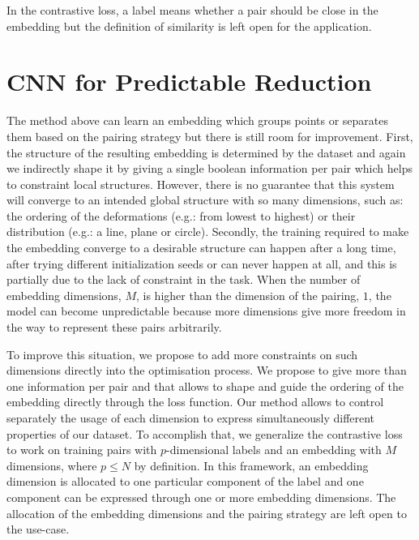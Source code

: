 \documentclass[a4paper,12pt]{report}
\newcommand{\eg}{e.g.}
\begin{document}
In the contrastive loss, a label means whether a pair should be close in the embedding but the definition of similarity is left open for the application.

\section{CNN for Predictable Reduction}
The method above can learn an embedding which groups points or separates them based on the pairing strategy but there is still room for improvement.
First, the structure of the resulting embedding is determined by the dataset and again we indirectly shape it by giving a single boolean information per pair which helps to constraint local structures.
However, there is no guarantee that this system will converge to an intended global structure with so many dimensions, such as: the ordering of the deformations (\eg: from lowest to highest) or their distribution (\eg: a line, plane or circle).
Secondly, the training required to make the embedding converge to a desirable structure can happen after a long time, after trying different initialization seeds or can never happen at all, and this is partially due to the lack of constraint in the task.
When the number of embedding dimensions, $M$, is higher than the dimension of the pairing, $1$, the model can become unpredictable because more dimensions give more freedom in the way to represent these pairs arbitrarily.

To improve this situation, we propose to add more constraints on such dimensions directly into the optimisation process.
We propose to give more than one information per pair and that allows to shape and guide the ordering of the embedding directly through the loss function.
Our method allows to control separately the usage of each dimension to express simultaneously different properties of our dataset.
To accomplish that, we generalize the contrastive loss to work on training pairs with $p$-dimensional labels and an embedding with $M$ dimensions, where $p \leq N$ by definition.
In this framework, an embedding dimension is allocated to one particular component of the label and one component can be expressed through one or more embedding dimensions.
The allocation of the embedding dimensions and the pairing strategy are left open to the use-case.
\end{document}
